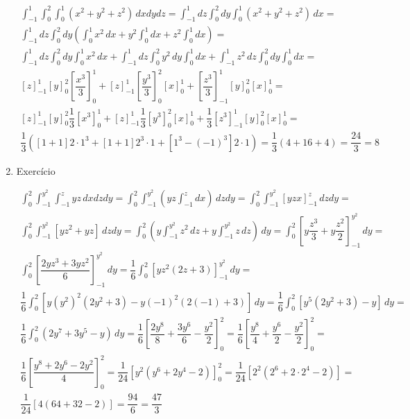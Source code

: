 \begin{enumerate}
	\begin{align*}
		\int_{-1}^1 \int_0^2 \int_0^1 \left(x^2 + y^2 + z^2\right)\, dxdydz = \int_{-1}^1 dz \int_0^2 dy \int_0^1 \left(x^2 + y^2 + z^2\right)\, dx =\\ \int_{-1}^1 dz \int_0^2 dy\left( \int_0^1 x^2\, dx + y^2\int_0^1 dx + z^2\int_0^1 dx\right) =\\ \int_{-1}^1 dz \int_0^2 dy \int_0^1 x^2\, dx + \int_{-1}^1 dz \int_0^2 y^2\, dy \int_0^1 dx + \int_{-1}^1 z^2\, dz \int_0^2 dy \int_0^1 dx =\\ [z]_{-1}^1 [y]_0^2 \left[\dfrac{x^3}{3}\right]_0^1 + [z]_{-1}^1 \left[\dfrac{y^3}{3}\right]_0^2 [x]_0^1 + \left[\dfrac{z^3}{3}\right]_{-1}^1 [y]_0^2 [x]_0^1 =\\ [z]_{-1}^1 [y]_0^2 \dfrac{1}{3}\left[x^3\right]_0^1 + [z]_{-1}^1 \dfrac{1}{3}\left[y^3\right]_0^2 [x]_0^1 + \dfrac{1}{3}\left[z^3\right]_{-1}^1 [y]_0^2 [x]_0^1 =\\ \dfrac{1}{3}\left([1 + 1]2\cdot1^3 + [1 + 1]2^3\cdot1 + \left[1^3 - (-1)^3\right]2\cdot1\right) = \dfrac{1}{3}\left(4 + 16 + 4\right) = \dfrac{24}{3} = 8
	\end{align*}
	
	\item Exercício
	
	\begin{align*}
		\int_0^2 \int_{-1}^{y^2} \int_{-1}^z yz\, dxdzdy = \int_0^2 \int_{-1}^{y^2}\left(yz\int_{-1}^z dx\right)\, dzdy = \int_0^2 \int_{-1}^{y^2} [yzx]_{-1}^z\, dzdy =\\ \int_0^2 \int_{-1}^{y^2} [yz^2 + yz]\, dzdy = \int_0^2\left(y\int_{-1}^{y^2} z^2\, dz + y\int_{-1}^{y^2} z\, dz\right)\, dy = \int_0^2 \left[y\dfrac{z^3}{3} + y\dfrac{z^2}{2}\right]_{-1}^{y^2}\, dy =\\ \int_0^2 \left[\dfrac{2yz^3 + 3yz^2}{6}\right]_{-1}^{y^2}\, dy = \dfrac{1}{6} \int_0^2 \left[yz^2\left(2z + 3\right)\right]_{-1}^{y^2}\, dy =\\ \dfrac{1}{6} \int_0^2 \left[y\left(y^2\right)^2\left(2y^2 + 3\right) - y(-1)^2\left(2(-1) + 3\right)\right]\, dy = \dfrac{1}{6} \int_0^2 \left[y^5\left(2y^2 + 3\right) - y\right]\, dy =\\ \dfrac{1}{6} \int_0^2 \left(2y^7 + 3y^5 - y\right)\, dy = \dfrac{1}{6} \left[\dfrac{2y^8}{8} + \dfrac{3y^6}{6} - \dfrac{y^2}{2}\right]_0^2 = \dfrac{1}{6} \left[\dfrac{y^8}{4} + \dfrac{y^6}{2} - \dfrac{y^2}{2}\right]_0^2 =\\ \dfrac{1}{6} \left[\dfrac{y^8 + 2y^6 - 2y^2}{4}\right]_0^2 = \dfrac{1}{24}\left[y^2\left(y^6 + 2y^4 - 2\right)\right]_0^2 = \dfrac{1}{24}\left[2^2\left(2^6 + 2\cdot2^4 - 2\right)\right] =\\ \dfrac{1}{24} \left[4\left(64 + 32 - 2\right)\right] = \dfrac{94}{6} = \dfrac{47}{3}
	\end{align*}
\end{enumerate}